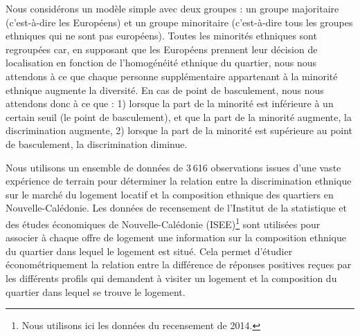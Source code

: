 \documentclass{Revue-economique} %
\begin{document}
\begin{Article}
Nous considérons un modèle simple avec deux groupes : un groupe majoritaire (c’est-à-dire les Européens) et un groupe minoritaire (c’est-à-dire tous les groupes ethniques qui ne sont pas européens). Toutes les minorités ethniques sont regroupées car, en supposant que les Européens prennent leur décision de localisation en fonction de l’homogénéité ethnique du quartier, nous nous attendons à ce que chaque personne supplémentaire appartenant à la minorité ethnique augmente la diversité. En cas de point de basculement, nous nous attendons donc à ce que : 1) lorsque la part de la minorité est inférieure à un certain seuil (le point de basculement), et que la part de la minorité augmente, la discrimination augmente, 2) lorsque la part de la minorité est supérieure au point de basculement, la discrimination diminue.

Nous utilisons un ensemble de données de 3 616 observations issues d’une vaste expérience de terrain pour déterminer la relation entre la discrimination ethnique sur le marché du logement locatif et la composition ethnique des quartiers en Nouvelle-Calédonie. Les données de recensement de l’Institut de la statistique et des études économiques de Nouvelle-Calédonie (ISEE)\footnote{Nous utilisons ici les données du recensement de 2014.} sont utilisées pour associer à chaque offre de logement une information sur la composition ethnique du quartier dans lequel le logement est situé. Cela permet d’étudier économétriquement la relation entre la différence de réponses positives reçues par les différents profils qui demandent à visiter un logement et la composition du quartier dans lequel se trouve le logement.


\end{Article}
\end{document}
